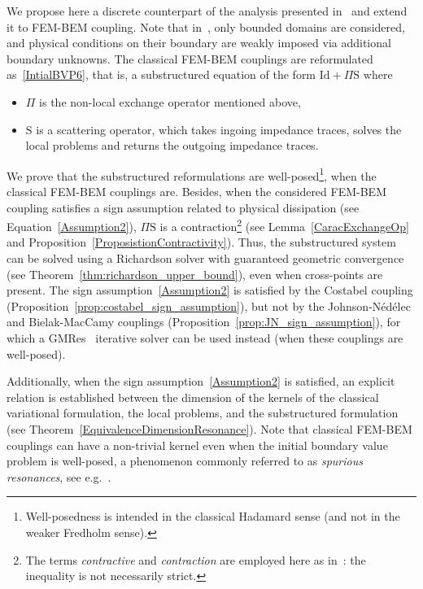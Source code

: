 \documentclass[a4paper,11pt]{article}
\newcommand{\Id}{\mathrm{Id}}
\newcommand{\mS}{\mathrm{S}}
\begin{document}
We propose here a discrete counterpart of the analysis presented in~\cite{MR4665035} and extend it to FEM-BEM coupling. Note that in~\cite{MR4665035}, only bounded domains are considered, and physical conditions on their boundary are weakly imposed via additional boundary unknowns. The classical FEM-BEM couplings are reformulated as~\eqref{IntialBVP6}, that is, a substructured equation of the form \(\Id+\Pi\mS\) where 
\begin{itemize}
  \item \(\Pi\) is the non-local exchange operator mentioned above,
  \item \(\mS\) is a scattering operator, which takes ingoing impedance traces, solves the local problems and returns the outgoing impedance traces. 
\end{itemize}
We prove that the substructured reformulations are well-posed\footnote{\label{note:well_posed}Well-posedness is intended in the classical Hadamard sense (and not in the weaker Fredholm sense).}, when the classical FEM-BEM couplings are. 
Besides, when the considered FEM-BEM coupling satisfies a sign assumption related to physical dissipation (see Equation~\eqref{Assumption2}), \(\Pi \mS\) is a contraction\footnote{\label{note:contraction}The terms \emph{contractive} and \emph{contraction} are employed here as in~\cite{Brezis2011FAS}: the inequality is not necessarily strict.} (see Lemma~\ref{CaracExchangeOp} and Proposition~\ref{ProposistionContractivity}). Thus, the substructured system can be solved using a Richardson solver with guaranteed geometric convergence (see Theorem~\ref{thm:richardson_upper_bound}), even when cross-points are present. The sign assumption~\eqref{Assumption2} is satisfied by the Costabel coupling (Proposition~\ref{prop:costabel_sign_assumption}), but not by the Johnson-Nédélec and Bielak-MacCamy couplings (Proposition~\ref{prop:JN_sign_assumption}), for which a GMRes~\cite{Saad2003IMS} iterative solver can be used instead (when these couplings are well-posed).

Additionally, when the sign assumption~\eqref{Assumption2} is satisfied, an
explicit relation is established between the dimension of the kernels of
the classical variational formulation, the local problems, and the
substructured formulation (see
Theorem~\ref{EquivalenceDimensionResonance}). Note that classical FEM-BEM
couplings can have a non-trivial kernel even when the initial boundary
value problem is well-posed, a phenomenon commonly referred to as
\emph{spurious resonances}, see e.g.~\cite{SchulzHiptmair2022}.
\end{document}
